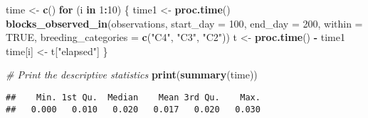 \documentclass[
]{article}
\newenvironment{Shaded}{\begin{snugshade}}{\end{snugshade}}
\newcommand{\AttributeTok}[1]{\textcolor[rgb]{0.13,0.29,0.53}{#1}}
\newcommand{\CommentTok}[1]{\textcolor[rgb]{0.56,0.35,0.01}{\textit{#1}}}
\newcommand{\ConstantTok}[1]{\textcolor[rgb]{0.56,0.35,0.01}{#1}}
\newcommand{\ControlFlowTok}[1]{\textcolor[rgb]{0.13,0.29,0.53}{\textbf{#1}}}
\newcommand{\DecValTok}[1]{\textcolor[rgb]{0.00,0.00,0.81}{#1}}
\newcommand{\FunctionTok}[1]{\textcolor[rgb]{0.13,0.29,0.53}{\textbf{#1}}}
\newcommand{\NormalTok}[1]{#1}
\newcommand{\OtherTok}[1]{\textcolor[rgb]{0.56,0.35,0.01}{#1}}
\newcommand{\SpecialCharTok}[1]{\textcolor[rgb]{0.81,0.36,0.00}{\textbf{#1}}}
\newcommand{\StringTok}[1]{\textcolor[rgb]{0.31,0.60,0.02}{#1}}
\begin{document}
\begin{Shaded}
\begin{Highlighting}[]
\NormalTok{time }\OtherTok{\textless{}{-}} \FunctionTok{c}\NormalTok{()}
\ControlFlowTok{for}\NormalTok{ (i }\ControlFlowTok{in} \DecValTok{1}\SpecialCharTok{:}\DecValTok{10}\NormalTok{) \{}
\NormalTok{  time1 }\OtherTok{\textless{}{-}} \FunctionTok{proc.time}\NormalTok{()}
  \FunctionTok{blocks\_observed\_in}\NormalTok{(observations, }\AttributeTok{start\_day =} \DecValTok{100}\NormalTok{, }\AttributeTok{end\_day =} \DecValTok{200}\NormalTok{, }
                               \AttributeTok{within =} \ConstantTok{TRUE}\NormalTok{,}
                               \AttributeTok{breeding\_categories =} \FunctionTok{c}\NormalTok{(}\StringTok{"C4"}\NormalTok{, }\StringTok{"C3"}\NormalTok{, }\StringTok{"C2"}\NormalTok{))}
\NormalTok{  t }\OtherTok{\textless{}{-}} \FunctionTok{proc.time}\NormalTok{() }\SpecialCharTok{{-}}\NormalTok{ time1}
\NormalTok{  time[i] }\OtherTok{\textless{}{-}}\NormalTok{ t[}\StringTok{"elapsed"}\NormalTok{]}
\NormalTok{\}}

\CommentTok{\# Print the descriptive statistics}
\FunctionTok{print}\NormalTok{(}\FunctionTok{summary}\NormalTok{(time))}
\end{Highlighting}
\end{Shaded}

\begin{verbatim}
##    Min. 1st Qu.  Median    Mean 3rd Qu.    Max. 
##   0.000   0.010   0.020   0.017   0.020   0.030
\end{verbatim}
\end{document}
